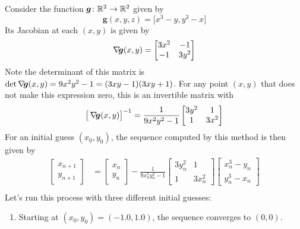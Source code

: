 \begin{example}\label{example:preNewton4poly4}
Consider the function $\boldsymbol{g}\colon \mathbb{R}^2 \to \mathbb{R}^2$ given by
\begin{equation*}
\boldsymbol{g}(x,y,z) = \big[ x^3-y, y^3-x \big]
\end{equation*}
Its Jacobian at each $(x,y)$ is given by
\begin{equation*}
\mathop{\nabla\! {\boldsymbol{g}}}(x,y) = \begin{bmatrix} 3x^2 & -1 \\ -1 & 3y^2 \end{bmatrix}
\end{equation*}
Note the determinant of this matrix is $\det \mathop{\nabla\! {\boldsymbol{g}}}(x,y) = 9x^2y^2-1 = (3xy-1)(3xy+1)$.  For any point $(x,y)$ that does not make this expression zero, this is an invertible matrix with 
\begin{equation*}
\big[ \mathop{\nabla\! {\boldsymbol{g}}}(x,y)\big]^{-1} = \frac{1}{9x^2y^2-1}\begin{bmatrix} 3y^2 & 1 \\ 1 & 3x^2 \end{bmatrix}
\end{equation*}
For an initial guess $(x_0, y_0)$, the sequence computed by this method is then given by
\begin{align*}
\begin{bmatrix} x_{n+1} \\ y_{n+1} \end{bmatrix} &= \begin{bmatrix} x_n \\ y_n \end{bmatrix} -\frac{1}{9 x_n^2 y_n^2-1}\begin{bmatrix} 3y_n^2 & 1 \\ 1 & 3x_n^2 \end{bmatrix} \begin{bmatrix} x_n^3-y_n \\ y_n^3-x_n \end{bmatrix} \\
\end{align*}
Let's run this process with three different initial guesses:
\begin{enumerate}
	\item Starting at $(x_0, y_0) = (-1.0,1.0)$, the sequence converges to $(0,0)$.  %

\end{enumerate}
\end{example}
